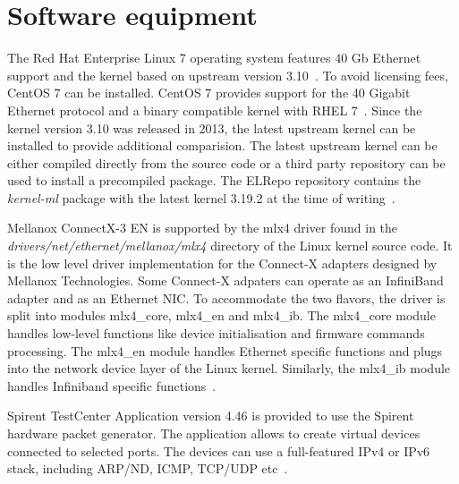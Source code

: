 
\section{Software equipment}\label{sec:analysis-software}
The Red Hat Enterprise Linux 7 operating system features 40 Gb Ethernet support and
the kernel based on upstream version 3.10~\cite{rhel-7-announce}.
To avoid licensing fees, CentOS 7 can be installed.
CentOS 7 provides support for the 40 Gigabit Ethernet protocol and a binary compatible kernel with RHEL 7~\cite{centos-7-announce}.
Since the kernel version 3.10 was released in 2013, the latest upstream kernel can be installed
to provide additional comparision.
The latest upstream kernel can be either compiled directly from the source code or a third party repository can be used
to install a precompiled package.
The ELRepo repository contains the {\it{kernel-ml}} package
with the latest kernel 3.19.2 at the time of writing~\cite{elrepo-kernel-ml}.

Mellanox ConnectX-3 EN is supported by the mlx4 driver found in the
{\it{drivers/net/ethernet/mellanox/mlx4}} directory of the Linux kernel source code.
It is the low level driver implementation for the Connect-X adapters designed by Mellanox Technologies.
Some Connect-X adpaters can operate as an InfiniBand adapter and as an Ethernet NIC.
To accommodate the two flavors, the driver is split into modules mlx4\_core, mlx4\_en and mlx4\_ib.
The mlx4\_core module handles low-level functions like device initialisation and firmware commands processing.
The mlx4\_en module handles Ethernet specific functions and
plugs into the network device layer of the Linux kernel.
Similarly, the mlx4\_ib module handles Infiniband specific functions~\cite{mellanox-user-manual}.

Spirent TestCenter Application version 4.46 is provided to use the Spirent hardware packet generator.
The application allows to create virtual devices connected to selected ports.
The devices can use a full-featured IPv4 or IPv6 stack, including ARP/ND, ICMP, TCP/UDP etc~\cite{spirent-app}.
